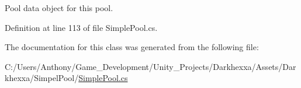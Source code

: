 Pool data object for this pool. 



Definition at line 113 of file Simple\-Pool.\-cs.



The documentation for this class was generated from the following file\-:\begin{DoxyCompactItemize}
\item 
C\-:/\-Users/\-Anthony/\-Game\-\_\-\-Development/\-Unity\-\_\-\-Projects/\-Darkhexxa/\-Assets/\-Darkhexxa/\-Simpel\-Pool/\hyperlink{_simple_pool_8cs}{Simple\-Pool.\-cs}\end{DoxyCompactItemize}
